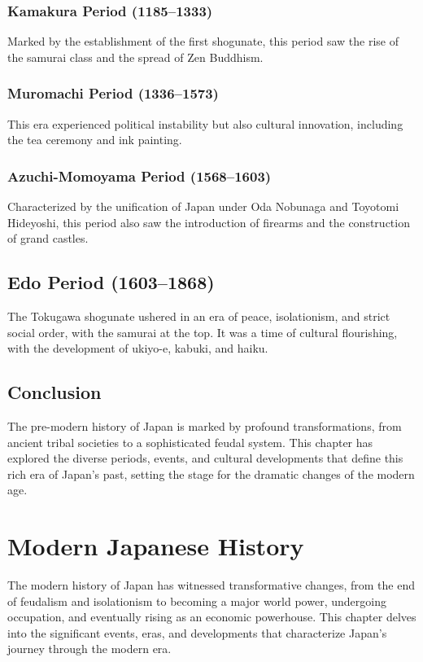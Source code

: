 \documentclass{book}
\begin{document}
\subsection{Kamakura Period (1185–1333)}
\label{subsec:kamakura-period}
Marked by the establishment of the first shogunate, this period saw the rise of the samurai class and the spread of Zen Buddhism.

\subsection{Muromachi Period (1336–1573)}
\label{subsec:muromachi-period}
This era experienced political instability but also cultural innovation, including the tea ceremony and ink painting.

\subsection{Azuchi-Momoyama Period (1568–1603)}
\label{subsec:azuchi-momoyama-period}
Characterized by the unification of Japan under Oda Nobunaga and Toyotomi Hideyoshi, this period also saw the introduction of firearms and the construction of grand castles.

\section{Edo Period (1603–1868)}
\label{sec:edo-period}
The Tokugawa shogunate ushered in an era of peace, isolationism, and strict social order, with the samurai at the top. It was a time of cultural flourishing, with the development of ukiyo-e, kabuki, and haiku.

\section{Conclusion}
\label{sec:conclusion-pre-modern-japan}
The pre-modern history of Japan is marked by profound transformations, from ancient tribal societies to a sophisticated feudal system. This chapter has explored the diverse periods, events, and cultural developments that define this rich era of Japan’s past, setting the stage for the dramatic changes of the modern age.

\chapter{Modern Japanese History}
\label{ch:modern-japanese-history}

The modern history of Japan has witnessed transformative changes, from the end of feudalism and isolationism to becoming a major world power, undergoing occupation, and eventually rising as an economic powerhouse. This chapter delves into the significant events, eras, and developments that characterize Japan’s journey through the modern era.
\end{document}
